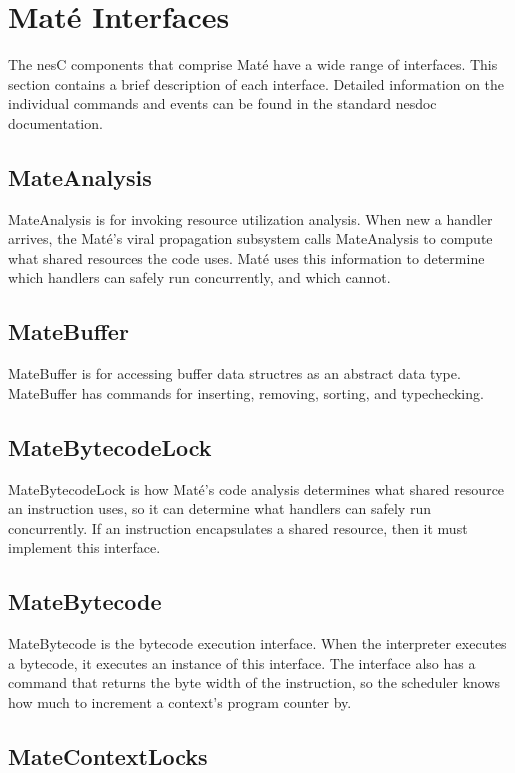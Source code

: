 \documentclass[12pt]{article}
\newcommand{\mate}{Mat\'{e}\xspace}
\begin{document}
\section{\mate Interfaces}

The nesC components that comprise \mate have a wide range of
interfaces. This section contains a brief description of each
interface. Detailed information on the individual commands and events
can be found in the standard nesdoc documentation.

\subsection{MateAnalysis}

MateAnalysis is for invoking resource utilization analysis. When new a
handler arrives, the \mate's viral propagation subsystem calls
MateAnalysis to compute what shared resources the code uses. \mate
uses this information to determine which handlers can safely run
concurrently, and which cannot.

\subsection{MateBuffer}

MateBuffer is for accessing buffer data structres as an abstract data
type. MateBuffer has commands for inserting, removing, sorting, and
typechecking.

\subsection{MateBytecodeLock}

MateBytecodeLock is how \mate's code analysis determines what shared
resource an instruction uses, so it can determine what handlers can
safely run concurrently. If an instruction encapsulates a shared
resource, then it must implement this interface.

\subsection{MateBytecode}

MateBytecode is the bytecode execution interface. When the interpreter
executes a bytecode, it executes an instance of this interface. The
interface also has a command that returns the byte width of the
instruction, so the scheduler knows how much to increment a context's
program counter by.

\subsection{MateContextLocks}
\end{document}
